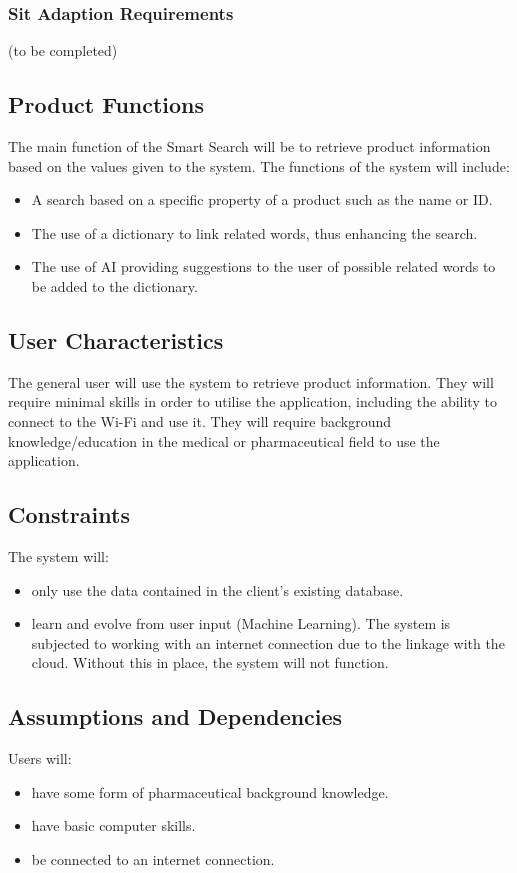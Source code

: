 \documentclass[a4paper,10pt]{article}
\begin{document}
           \subsubsection{Sit Adaption Requirements}
        (to be completed)

		\subsection{Product Functions} {The main function of the Smart Search will be to retrieve product information based on the values given to the system. The functions of the system will include:  }
	\begin{itemize}
  		\item A search based on a specific property of a product such as the name or ID.
		\item The use of a dictionary to link related words, thus enhancing the search.
		\item The use of AI providing suggestions to the user of possible related words to be added to the dictionary.
	\end{itemize}
	
    	\subsection{User Characteristics}  

{The general user will use the system to retrieve product information. They will require minimal skills in order to utilise the application, including the ability to connect to the Wi-Fi and use it. They will require background knowledge/education in the medical or pharmaceutical field to use the application.\\}

    	\subsection{Constraints}
	The system will:
	\begin{itemize}
		\item only use the data contained in the client's existing database.
		\item learn and evolve from user input (Machine Learning).
	The system is subjected to working with an internet connection due to the linkage with the cloud. Without this in place, the system will not function.	
		
	\end{itemize}
	
    	\subsection{Assumptions and Dependencies}
	Users will:	
	\begin{itemize}
		\item have some form of pharmaceutical background knowledge.
		\item have basic computer skills.
		\item be connected to an internet connection.
	\end{itemize}
\end{document}
